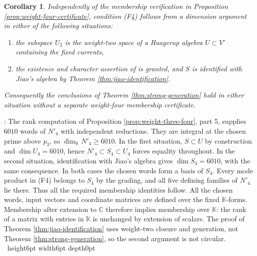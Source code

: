 \documentclass[leqno]{article}
\newcommand{\Cbb}{\ensuremath{\mathbb{C}}}
\newcommand{\K}{\ensuremath{\mathbb{K}}}
\renewcommand{\geq}{\ensuremath{\geqslant}}
\newcommand{\qed}{\hfill \vrule height6pt  width6pt depth0pt}
\newtheorem{cor}[thm]{Corollary}
\newenvironment{proof}[1][]{\noindent {\it Proof #1} : }{\hbox{~}\qed
\smallskip
}
\numberwithin{equation}{section}
\begin{document}
\begin{cor}
\label{cor:weight-four-from-haagerup}
Independently of the membership verification in Proposition \ref{prop:weight-four-certificate}, condition \textup{(F4)} follows from a dimension argument in either of the following situations:
\begin{enumerate}
\item the subspace $U_2$ is the weight-two space of a Haagerup algebra $U \subset V'$ containing the fixed currents,
\item the existence and character assertion of \cite{Jia26} is granted, and $S$ is identified with Jiao's algebra by Theorem \ref{thm:jiao-identification}.
\end{enumerate}
Consequently the conclusions of Theorem \ref{thm:strong-generation} hold in either situation without a separate weight-four membership certificate.
\end{cor}

\begin{proof}
The rank computation of Proposition \ref{prop:weight-three-four}, part 5, supplies $6010$ words of $N'_4$ with independent reductions. They are integral at the chosen prime above $p_3$, so $\dim_{\K}N'_4 \geq 6010$. In the first situation, $S \subset U$ by construction and $\dim U_4 = 6010$, hence $N'_4 \subset S_4 \subset U_4$ forces equality throughout. In the second situation, identification with Jiao's algebra gives $\dim S_4 = 6010$, with the same consequence. In both cases the chosen words form a basis of $S_4$. Every mode product in \textup{(F4)} belongs to $S_4$ by the grading, and all five defining families of $N'_4$ lie there. Thus all the required membership identities follow. All the chosen words, input vectors and coordinate matrices are defined over the fixed $\K$-forms. Membership after extension to $\Cbb$ therefore implies membership over $\K$: the rank of a matrix with entries in $\K$ is unchanged by extension of scalars. The proof of Theorem \ref{thm:jiao-identification} uses weight-two closure and generation, not Theorem \ref{thm:strong-generation}, so the second argument is not circular.
\end{proof}
\end{document}
